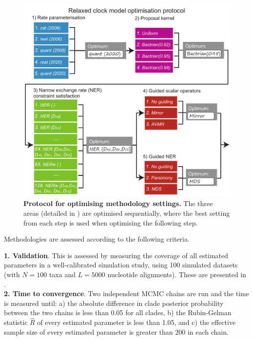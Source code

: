 \documentclass[10pt,letterpaper]{article}
\begin{document}
\begin{figure}[!h]
\includegraphics[width=\textwidth]{Figures/tournament.pdf}
\caption{\textbf{Protocol for optimising methodology settings.} The three areas (detailed in \textbf{}) are optimised sequentially, where the best setting from each step is used when optimising the following step.}
\label{fig:tournament}
\end{figure}


Methodologies are assessed according to the following criteria.


\textbf{1. Validation}. This is assessed by measuring the coverage of all estimated parameters in a well-calibrated simulation study, using 100 simulated datasets (with $N=100$ taxa and $L=5000$ nucleotide alignments). These are presented in \textbf{}. \\

\textbf{2. Time to convergence}. Two independent MCMC chains are run and the time is measured until: a) the absolute difference in clade posterior probability between the two chains is less than 0.05 for all clades, b) the Rubin-Gelman statistic $\hat{R}$ \cite{gelman1992inference} of every estimated parameter is less than 1.05, and c) the effective sample size \cite{rambaut2018posterior} of every estimated parameter is greater than 200 in each chain. \\
\end{document}
